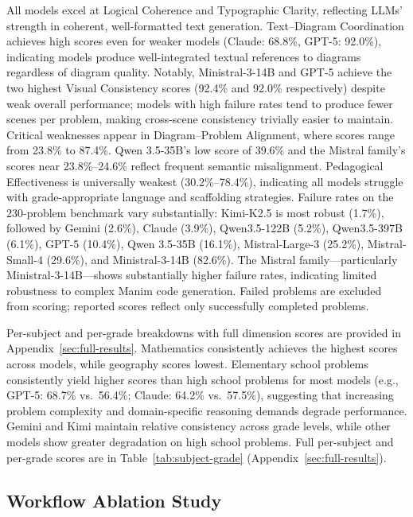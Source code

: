 \documentclass[11pt]{article}
\begin{document}
All models excel at Logical Coherence and Typographic Clarity, reflecting LLMs' strength in coherent, well-formatted text generation. Text--Diagram Coordination achieves high scores even for weaker models (Claude: 68.8\%, GPT-5: 92.0\%), indicating models produce well-integrated textual references to diagrams regardless of diagram quality. Notably, Ministral-3-14B and GPT-5 achieve the two highest Visual Consistency scores (92.4\% and 92.0\% respectively) despite weak overall performance; models with high failure rates tend to produce fewer scenes per problem, making cross-scene consistency trivially easier to maintain. Critical weaknesses appear in Diagram--Problem Alignment, where scores range from 23.8\% to 87.4\%. Qwen 3.5-35B's low score of 39.6\% and the Mistral family's scores near 23.8\%--24.6\% reflect frequent semantic misalignment. Pedagogical Effectiveness is universally weakest (30.2\%--78.4\%), indicating all models struggle with grade-appropriate language and scaffolding strategies. Failure rates on the 230-problem benchmark vary substantially: Kimi-K2.5 is most robust (1.7\%), followed by Gemini (2.6\%), Claude (3.9\%), Qwen3.5-122B (5.2\%), Qwen3.5-397B (6.1\%), GPT-5 (10.4\%), Qwen 3.5-35B (16.1\%), Mistral-Large-3 (25.2\%), Mistral-Small-4 (29.6\%), and Ministral-3-14B (82.6\%). The Mistral family---particularly Ministral-3-14B---shows substantially higher failure rates, indicating limited robustness to complex Manim code generation. Failed problems are excluded from scoring; reported scores reflect only successfully completed problems.

Per-subject and per-grade breakdowns with full dimension scores are provided in Appendix~\ref{sec:full-results}. Mathematics consistently achieves the highest scores across models, while geography scores lowest. Elementary school problems consistently yield higher scores than high school problems for most models (e.g., GPT-5: 68.7\% vs.\ 56.4\%; Claude: 64.2\% vs.\ 57.5\%), suggesting that increasing problem complexity and domain-specific reasoning demands degrade performance. Gemini and Kimi maintain relative consistency across grade levels, while other models show greater degradation on high school problems. Full per-subject and per-grade scores are in Table~\ref{tab:subject-grade} (Appendix~\ref{sec:full-results}).



\subsection{Workflow Ablation Study}
\end{document}
